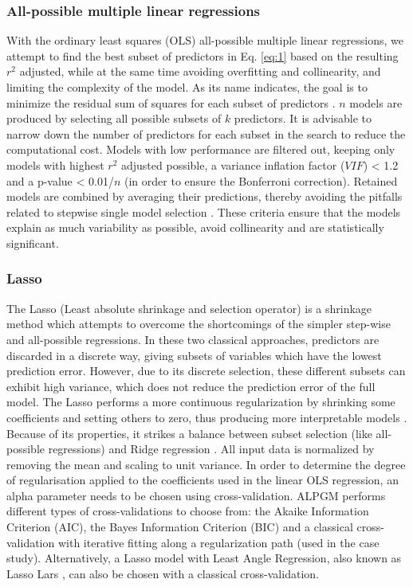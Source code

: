 \subsubsection{All-possible multiple linear regressions} \label{methods:methods:ols}

With the ordinary least squares (OLS) all-possible multiple linear regressions, we attempt to find the best subset of predictors in Eq. \ref{eq:1} based on the resulting \(r^2\) adjusted, while at the same time avoiding overfitting \citep{hawkins_problem_2004} and collinearity, and limiting the complexity of the model. As its name indicates, the goal is to minimize the residual sum of squares for each subset of predictors \citep{hastie_elements_2009}. $n$ models are produced by selecting all possible subsets of $k$ predictors. It is advisable to narrow down the number of predictors for each subset in the search to reduce the computational cost. Models with low performance are filtered out, keeping only models with highest \(r^2\) adjusted possible, a variance inflation factor ($VIF$) < 1.2 and a p-value < 0.01/$n$ (in order to ensure the Bonferroni correction). Retained models are combined by averaging their predictions, thereby avoiding the pitfalls related to stepwise single model selection \citep{whittingham_why_2006}. These criteria ensure that the models explain as much variability as possible, avoid collinearity and are statistically significant. 

\subsubsection{Lasso} \label{methods:methods:lasso}

The Lasso (Least absolute shrinkage and selection operator) \citep{tibshirani_regression_1996} is a shrinkage method which attempts to overcome the shortcomings of the simpler step-wise and all-possible regressions. In these two classical approaches, predictors are discarded in a discrete way, giving subsets of variables which have the lowest prediction error. However, due to its discrete selection, these different subsets can exhibit high variance, which does not reduce the prediction error of the full model. The Lasso performs a more continuous regularization by shrinking some coefficients and setting others to zero, thus producing more interpretable models \citep{hastie_elements_2009}. Because of its properties, it strikes a balance between subset selection (like all-possible regressions) and Ridge regression \citep{hoerl_ridge_1970}. All input data is normalized by removing the mean and scaling to unit variance. In order to determine the degree of regularisation applied to the coefficients used in the linear OLS regression, an alpha parameter needs to be chosen using cross-validation. ALPGM performs different types of cross-validations to choose from: the Akaike Information Criterion (AIC), the Bayes Information Criterion (BIC) and a classical cross-validation with iterative fitting along a regularization path (used in the case study). Alternatively, a Lasso model with Least Angle Regression, also known as Lasso Lars \citep{tibshirani_least_2004}, can also be chosen with a classical cross-validation. 


